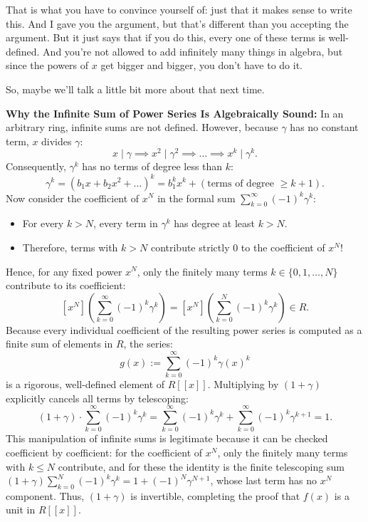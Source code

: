 \begin{proofWrapper}
\begin{speech}[00:41:31 - 00:42:50]
That is what you have to convince yourself of: just that it makes sense to write this. And I gave you the argument, but that's different than you accepting the argument. But it just says that if you do this, every one of these terms is well-defined. And you're not allowed to add infinitely many things in algebra, but since the powers of $x$ get bigger and bigger, you don't have to do it.

So, maybe we'll talk a little bit more about that next time. 
\end{speech}

\begin{content}
\textbf{Why the Infinite Sum of Power Series Is Algebraically Sound:}
In an arbitrary ring, infinite sums are not defined. However, because $\gamma$ has no constant term, $x$ divides $\gamma$:
\begin{equation}\label{eq:x-divisibility-chain}
x \mid \gamma \implies x^2 \mid \gamma^2 \implies \dots \implies x^k \mid \gamma^k.
\end{equation}
Consequently, $\gamma^k$ has no terms of degree less than $k$:
\[
\gamma^k = (b_1 x + b_2 x^2 + \dots)^k = b_1^k x^k + (\text{terms of degree } \ge k+1).
\]
Now consider the coefficient of $x^N$ in the formal sum $\sum_{k=0}^\infty (-1)^k \gamma^k$:
\begin{itemize}
    \item For every $k > N$, every term in $\gamma^k$ has degree at least $k > N$.
    \item Therefore, terms with $k > N$ contribute strictly $0$ to the coefficient of $x^N$!
\end{itemize}
Hence, for any fixed power $x^N$, only the finitely many terms $k \in \{0, 1, \dots, N\}$ contribute to its coefficient:
\begin{equation}\label{eq:finite-coeff-contribution}
[x^N]\left( \sum_{k=0}^\infty (-1)^k \gamma^k \right) = [x^N]\left( \sum_{k=0}^N (-1)^k \gamma^k \right) \in R.
\end{equation}
Because every individual coefficient of the resulting power series is computed as a finite sum of elements in $R$, the series:
\[
g(x) := \sum_{k=0}^\infty (-1)^k \gamma(x)^k
\]
is a rigorous, well-defined element of $R[[x]]$. Multiplying by $(1 + \gamma)$ explicitly cancels all terms by telescoping:
\[
(1 + \gamma) \cdot \sum_{k=0}^\infty (-1)^k \gamma^k = \sum_{k=0}^\infty (-1)^k \gamma^k + \sum_{k=0}^\infty (-1)^k \gamma^{k+1} = 1.
\]
This manipulation of infinite sums is legitimate because it can be checked coefficient by coefficient: for the coefficient of $x^N$, only the finitely many terms with $k \le N$ contribute, and for these the identity is the finite telescoping sum $(1 + \gamma) \sum_{k=0}^{N} (-1)^k \gamma^k = 1 + (-1)^N \gamma^{N+1}$, whose last term has no $x^N$ component.
Thus, $(1 + \gamma)$ is invertible, completing the proof that $f(x)$ is a unit in $R[[x]]$.
\end{content}

\end{proofWrapper}

